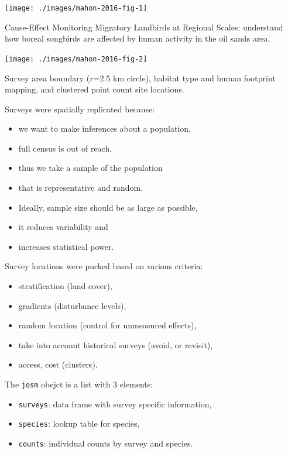 \documentclass[12pt,]{book}
\providecommand{\tightlist}{%
  \setlength{\itemsep}{0pt}\setlength{\parskip}{0pt}}
\begin{document}
\texttt{[image: ./images/mahon-2016-fig-1]}

Cause-Effect Monitoring Migratory Landbirds at Regional Scales:
understand how boreal songbirds are affected by human activity in the oil sands area.

\texttt{[image: ./images/mahon-2016-fig-2]}

Survey area boundary (\(r\)=2.5 km circle), habitat type and human footprint mapping,
and clustered point count site locations.

Surveys were spatially replicated because:

\begin{itemize}
\tightlist
\item
  we want to make inferences about a population,
\item
  full census is out of reach,
\item
  thus we take a sample of the population
\item
  that is representative and random.
\item
  Ideally, sample size should be as large as possible,
\item
  it reduces variability and
\item
  increases statistical power.
\end{itemize}

Survey locations were pucked based on various criteria:

\begin{itemize}
\tightlist
\item
  stratification (land cover),
\item
  gradients (disturbance levels),
\item
  random location (control for unmeasured effects),
\item
  take into account historical surveys (avoid, or revisit),
\item
  access, cost (clusters).
\end{itemize}

The \texttt{josm} obejct is a list with 3 elements:

\begin{itemize}
\tightlist
\item
  \texttt{surveys}: data frame with survey specific information,
\item
  \texttt{species}: lookup table for species,
\item
  \texttt{counts}: individual counts by survey and species.
\end{itemize}
\end{document}
